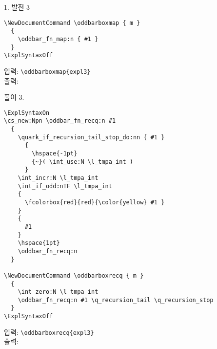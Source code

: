 \documentclass[a4paper,amsmath,itemph]{oblivoir}
\begin{document}
\begin{questionp}{1. 발전 3}
\begin{verbatim}
\NewDocumentCommand \oddbarboxmap { m }
  {
    \oddbar_fn_map:n { #1 }
  }
\ExplSyntaxOff
  \end{verbatim}

  \begin{tcolorbox}{}
    입력: \verb|\oddbarboxmap{expl3}|\\
    출력: 
  \end{tcolorbox}

  풀이 3.
  
  \begin{verbatim}
\ExplSyntaxOn
\cs_new:Npn \oddbar_fn_recq:n #1
  {
    \quark_if_recursion_tail_stop_do:nn { #1 }
      {
        \hspace{-1pt}
        {~}( \int_use:N \l_tmpa_int )
      }
    \int_incr:N \l_tmpa_int
    \int_if_odd:nTF \l_tmpa_int
    {
      \fcolorbox{red}{red}{\color{yellow} #1 }
    }
    {
      #1
    }
    \hspace{1pt}
    \oddbar_fn_recq:n
  }

\NewDocumentCommand \oddbarboxrecq { m }
  {
    \int_zero:N \l_tmpa_int
    \oddbar_fn_recq:n #1 \q_recursion_tail \q_recursion_stop
  }
\ExplSyntaxOff
  \end{verbatim}

  \begin{tcolorbox}{}
    입력: \verb|\oddbarboxrecq{expl3}|\\
    출력: 
  \end{tcolorbox}

\end{questionp}
\end{document}
